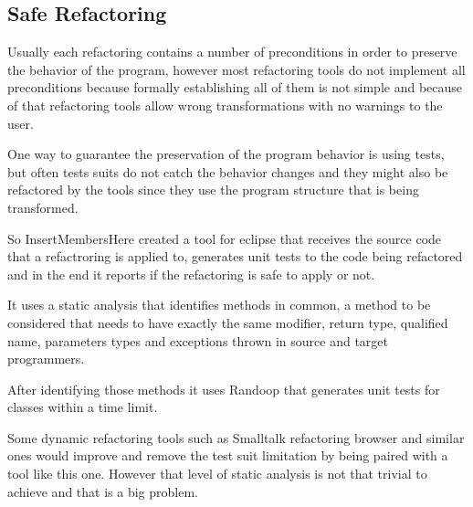 \subsection{Safe Refactoring}
\cite{soares2010making} Usually each refactoring contains a number of preconditions in order to preserve the behavior of the program, however most refactoring tools do not implement all preconditions because formally establishing all of them is not simple and because of that refactoring tools allow wrong transformations with no warnings to the user.

One way to guarantee the preservation of the program behavior is using tests, but often tests suits do not catch the behavior changes and they might also be refactored by the tools since they use the program structure that is being transformed.

So InsertMembersHere created a tool for eclipse that receives the source code that a refactroring is applied to, generates unit tests to the code being refactored and in the end it reports if the refactoring is safe to apply or not.

It uses a static analysis that identifies methods in common, a method to be considered that needs to have exactly the same modifier, return type, qualified name, parameters types and exceptions thrown in source and target programmers.

After identifying those methods it uses Randoop \cite{pacheco2007feedback}%
that generates unit tests for classes within a time limit.

Some dynamic refactoring tools such as Smalltalk refactoring browser and similar ones would improve and remove the test suit limitation by being paired with a tool like this one. However that level of static analysis is not that trivial to achieve and that is a big problem. %